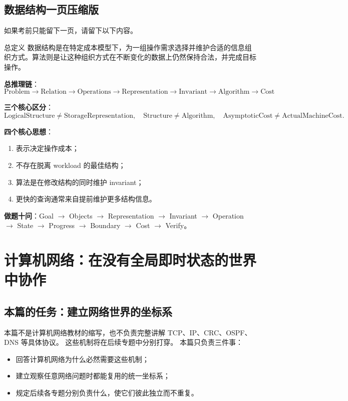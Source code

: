 \documentclass[11pt,a4paper,openany]{ctexbook}
\newcommand{\key}[1]{\textbf{\color{deep}#1}}
\begin{document}
\section{数据结构一页压缩版}

如果考前只能留下一页，请留下以下内容。

\begin{corebox}{总定义}
数据结构是在特定成本模型下，为一组操作需求选择并维护合适的信息组织方式。算法则是让这种组织方式在不断变化的数据上仍然保持合法，并完成目标操作。
\end{corebox}

\key{总推理链}：
\[
\boxed{\text{Problem}\rightarrow\text{Relation}\rightarrow\text{Operations}\rightarrow\text{Representation}\rightarrow\text{Invariant}\rightarrow\text{Algorithm}\rightarrow\text{Cost}}
\]

\key{三个核心区分}：
\[
\text{LogicalStructure}\neq\text{StorageRepresentation},\quad
\text{Structure}\neq\text{Algorithm},\quad
\text{AsymptoticCost}\neq\text{ActualMachineCost}.
\]

\key{四个核心思想}：
\begin{enumerate}
  \item 表示决定操作成本；
  \item 不存在脱离 workload 的最佳结构；
  \item 算法是在修改结构的同时维护 invariant；
  \item 更快的查询通常来自提前维护更多结构信息。
\end{enumerate}

\key{做题十问}：Goal $\rightarrow$ Objects $\rightarrow$ Representation $\rightarrow$ Invariant $\rightarrow$ Operation $\rightarrow$ State $\rightarrow$ Progress $\rightarrow$ Boundary $\rightarrow$ Cost $\rightarrow$ Verify。

\chapter{计算机网络：在没有全局即时状态的世界中协作}

\section{本篇的任务：建立网络世界的坐标系}
本篇不是计算机网络教材的缩写，也不负责完整讲解 TCP、IP、CRC、OSPF、DNS 等具体协议。
这些机制将在后续专题中分别打穿。
本篇只负责三件事：
\begin{itemize}
    \item 回答计算机网络为什么必然需要这些机制；
    \item 建立观察任意网络问题时都能复用的统一坐标系；
    \item 规定后续各专题分别负责什么，使它们彼此独立而不重复。
\end{itemize}
\end{document}
